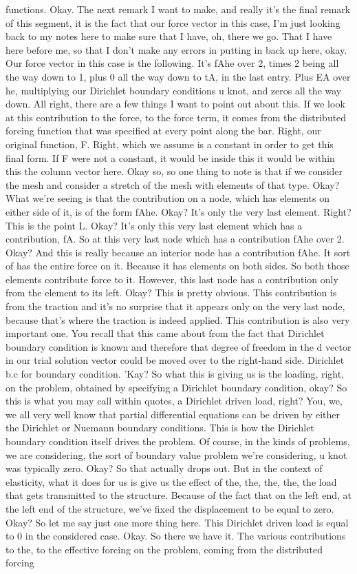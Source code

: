 \documentclass[10pt]{article}
\begin{document}
functions. Okay. The next remark I want to make, and really it's the final remark of this segment, it is the fact that our force vector in this case, I'm just looking back to my notes here to make sure that I have, oh, there we go. That I have here before me, so that I don't make any errors in putting in back up here, okay. Our force vector in this case is the following. It's fAhe over 2, times 2 being all the way down to 1, plus 0 all the way down to tA, in the last entry. Plus EA over he, multiplying our Dirichlet boundary conditions u knot, and zeros all the way down. All right, there are a few things I want to point out about this. If we look at this contribution to the force, to the force term, it comes from the distributed forcing function that was specified at every point along the bar. Right, our original function, F. Right, which we assume is a constant in order to get this final form. If F were not a constant, it would be inside this it would be within this the column vector here. Okay so, so one thing to note is that if we consider the mesh and consider a stretch of the mesh with elements of that type. Okay? What we're seeing is that the contribution on a node, which has elements on either side of it, is of the form fAhe. Okay? It's only the very last element. Right? This is the point L. Okay? It's only this very last element which has a contribution, fA. So at this very last node which has a contribution fAhe over 2. Okay? And this is really because an interior node has a contribution fAhe. It sort of has the entire force on it. Because it has elements on both sides. So both those elements contribute force to it. However, this last node has a contribution only from the element to its left. Okay? This is pretty obvious. This contribution is from the traction and it's no surprise that it appears only on the very last node, because that's where the traction is indeed applied. This contribution is also very important one. You recall that this came about from the fact that Dirichlet boundary condition is known and therefore that degree of freedom in the d vector in our trial solution vector could be moved over to the right-hand side. Dirichlet b.c for boundary condition. 'Kay? So what this is giving us is the loading, right, on the problem, obtained by specifying a Dirichlet boundary condition, okay? So this is what you may call within quotes, a Dirichlet driven load, right? You, we, we all very well know that partial differential equations can be driven by either the Dirichlet or Nuemann boundary conditions. This is how the Dirichlet boundary condition itself drives the problem. Of course, in the kinds of problems, we are considering, the sort of boundary value problem we're considering, u knot was typically zero. Okay? So that actually drops out. But in the context of elasticity, what it does for us is give us the effect of the, the, the, the, the load that gets transmitted to the structure. Because of the fact that on the left end, at the left end of the structure, we've fixed the displacement to be equal to zero. Okay? So let me say just one more thing here. This Dirichlet driven load is equal to 0 in the considered case. Okay. So there we have it. The various contributions to the, to the effective forcing on the problem, coming from the distributed forcing 
\end{document}
